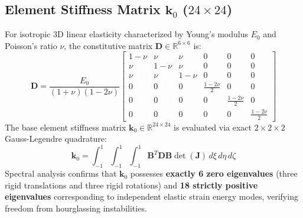 \documentclass[11pt, a4paper]{article}
\begin{document}
\subsection{Element Stiffness Matrix \texorpdfstring{$\mathbf{k}_0$}{k\_0} ($24 \times 24$)}
For isotropic 3D linear elasticity characterized by Young's modulus $E_0$ and Poisson's ratio $\nu$, the constitutive matrix $\mathbf{D} \in \mathbb{R}^{6 \times 6}$ is:
\begin{equation}
\mathbf{D} = \frac{E_0}{(1+\nu)(1-2\nu)} \begin{bmatrix}
1-\nu & \nu & \nu & 0 & 0 & 0 \\
\nu & 1-\nu & \nu & 0 & 0 & 0 \\
\nu & \nu & 1-\nu & 0 & 0 & 0 \\
0 & 0 & 0 & \frac{1-2\nu}{2} & 0 & 0 \\
0 & 0 & 0 & 0 & \frac{1-2\nu}{2} & 0 \\
0 & 0 & 0 & 0 & 0 & \frac{1-2\nu}{2}
\end{bmatrix}
\end{equation}
The base element stiffness matrix $\mathbf{k}_0 \in \mathbb{R}^{24 \times 24}$ is evaluated via exact $2 \times 2 \times 2$ Gauss-Legendre quadrature:
\begin{equation}
\mathbf{k}_0 = \int_{-1}^1 \int_{-1}^1 \int_{-1}^1 \mathbf{B}^T \mathbf{D} \mathbf{B} \det(\mathbf{J}) \, d\xi \, d\eta \, d\zeta
\end{equation}
Spectral analysis confirms that $\mathbf{k}_0$ possesses \textbf{exactly 6 zero eigenvalues} (three rigid translations and three rigid rotations) and \textbf{18 strictly positive eigenvalues} corresponding to independent elastic strain energy modes, verifying freedom from hourglassing instabilities.
\end{document}
